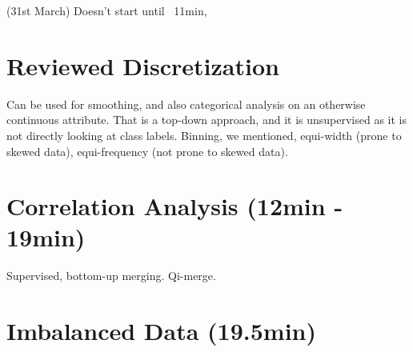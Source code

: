 \documentclass{article}
\begin{document}
(31st March) Doesn't start until ~11min, 
\section{Reviewed Discretization}
Can be used for smoothing, and also categorical analysis on an otherwise continuous attribute. That is a top-down approach, and it is unsupervised as it is not directly looking at class labels. Binning, we mentioned, equi-width (prone to skewed data), equi-frequency (not prone to skewed data).

\section{Correlation Analysis (12min - 19min)}
Supervised, bottom-up merging. Qi-merge.

\section{Imbalanced Data (19.5min)}
\end{document}

